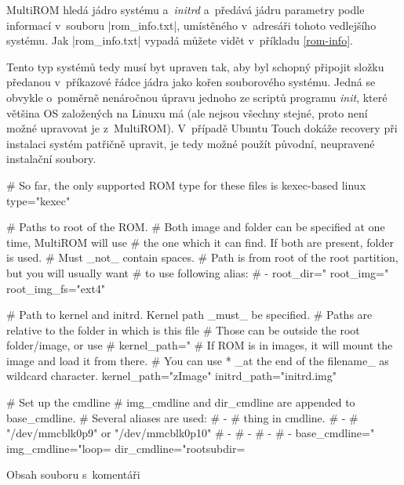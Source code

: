 \documentclass[12pt, a4paper, oneside]{article}
\newcommand{\It}{\textit}  %
\begin{document}
MultiROM hledá jádro systému a~\It{initrd} a~předává jádru parametry podle informací v~souboru |rom_info.txt|, umístěného v~adresáři tohoto vedlejšího systému. Jak |rom_info.txt| vypadá můžete vidět v~příkladu \ref{rom-info}.

Tento typ systémů tedy musí byt upraven tak, aby byl schopný připojit složku předanou v~příkazové řádce jádra jako kořen souborového systému. Jedná se obvykle o~poměrně nenáročnou úpravu jednoho ze scriptů programu \It{init}, které většina OS založených na Linuxu má (ale nejsou všechny stejné, proto není možné upravovat je z~MultiROM). V~případě Ubuntu Touch dokáže recovery při instalaci systém patřičně upravit, je tedy možné použít původní, neupravené instalační soubory.

\linespread{1.1}
\begin{listing}[H]
\begin{inicode}
# So far, the only supported ROM type for these files is kexec-based linux
type="kexec"

# Paths to root of the ROM.
# Both image and folder can be specified at one time, MultiROM will use 
# the one which it can find. If both are present, folder is used.
# Must _not_ contain spaces.
# Path is from root of the root partition, but you will usually want
# to use following alias:
# - %
root_dir="%
root_img="%
root_img_fs="ext4"

# Path to kernel and initrd. Kernel path _must_ be specified.
# Paths are relative to the folder in which is this file
# Those can be outside the root folder/image, or use %
# kernel_path="%
# If ROM is in images, it will mount the image and load it from there.
# You can use  * _at the end of the filename_ as wildcard character.
kernel_path="zImage"
initrd_path="initrd.img"

# Set up the cmdline
# img_cmdline and dir_cmdline are appended to base_cmdline.
# Several aliases are used:
#  - %
#         thing in cmdline.
#  - %
#         "/dev/mmcblk0p9" or "/dev/mmcblk0p10"
#  - %
#  - %
#  - %
#  - %
base_cmdline="%
img_cmdline="loop=%
dir_cmdline="rootsubdir=%
\end{inicode}
\caption{Obsah souboru  s~komentáři}
\label{rom-info}
\end{listing}
\end{document}
